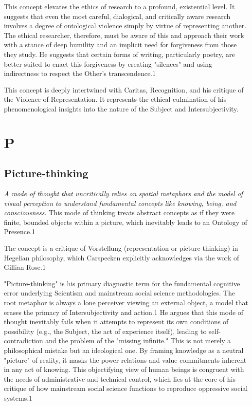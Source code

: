 \documentclass{book}
\begin{document}
This concept elevates the ethics of research to a profound, existential level. It suggests that even the most careful, dialogical, and critically aware research involves a degree of ontological violence simply by virtue of representing another. The ethical researcher, therefore, must be aware of this and approach their work with a stance of deep humility and an implicit need for forgiveness from those they study. He suggests that certain forms of writing, particularly poetry, are better suited to enact this forgiveness by creating "silences" and using indirectness to respect the Other's transcendence.1

This concept is deeply intertwined with Caritas, Recognition, and his critique of the Violence of Representation. It represents the ethical culmination of his phenomenological insights into the nature of the Subject and Intersubjectivity.

\parencite{HenzeCarspecken2018}




\chapter{P}

\section{Picture-thinking}

\textit{A mode of thought that uncritically relies on spatial metaphors and the model of visual perception to understand fundamental concepts like knowing, being, and consciousness.} This mode of thinking treats abstract concepts as if they were finite, bounded objects within a picture, which inevitably leads to an Ontology of Presence.1

The concept is a critique of Vorstellung (representation or picture-thinking) in Hegelian philosophy, which Carspecken explicitly acknowledges via the work of Gillian Rose.1

"Picture-thinking" is his primary diagnostic term for the fundamental cognitive error underlying Scientism and mainstream social science methodologies. The root metaphor is always a lone perceiver viewing an external object, a model that erases the primacy of Intersubjectivity and action.1 He argues that this mode of thought inevitably fails when it attempts to represent its own conditions of possibility (e.g., the Subject, the act of experience itself), leading to self-contradiction and the problem of the "missing infinite." This is not merely a philosophical mistake but an ideological one. By framing knowledge as a neutral "picture" of reality, it masks the power relations and value commitments inherent in any act of knowing. This objectifying view of human beings is congruent with the needs of administrative and technical control, which lies at the core of his critique of how mainstream social science functions to reproduce oppressive social systems.1
\end{document}

